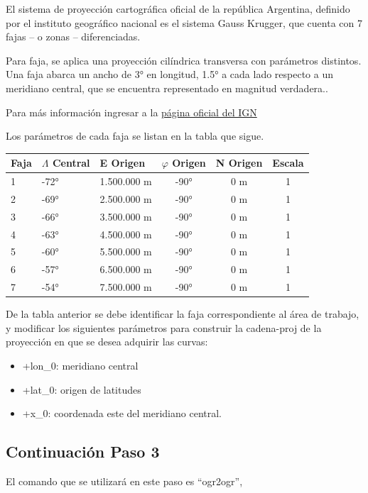 \documentclass[12pt,]{extarticle}
\begin{document}
El sistema de proyección cartográfica oficial de la república Argentina,
definido por el instituto geográfico nacional es el sistema Gauss
Krugger, que cuenta con 7 fajas -- o zonas -- diferenciadas.

Para faja, se aplica una proyección cilíndrica transversa con parámetros
distintos. Una faja abarca un ancho de 3° en longitud, 1.5° a cada lado
respecto a un meridiano central, que se encuentra representado en
magnitud verdadera..

Para más información ingresar a la
\href{http://www.ign.gob.ar/NuestrasActividades/ProduccionCartografica/sistemas-de-proyeccion}{página
oficial del IGN}

Los parámetros de cada faja se listan en la tabla que sigue.

\begin{minipage}{10cm}
\begin{longtable}[]{@{}lllccc@{}}
\toprule
Faja & \(\Lambda\) Central & E Origen & \(\varphi\) Origen & N Origen &
Escala\tabularnewline
\midrule
\endhead
1 & -72° & 1.500.000 m & -90° & 0 m & 1\tabularnewline
2 & -69° & 2.500.000 m & -90° & 0 m & 1\tabularnewline
3 & -66° & 3.500.000 m & -90° & 0 m & 1\tabularnewline
4 & -63° & 4.500.000 m & -90° & 0 m & 1\tabularnewline
5 & -60° & 5.500.000 m & -90° & 0 m & 1\tabularnewline
6 & -57° & 6.500.000 m & -90° & 0 m & 1\tabularnewline
7 & -54° & 7.500.000 m & -90° & 0 m & 1\tabularnewline
\bottomrule
\end{longtable}
\end{minipage}

De la tabla anterior se debe identificar la faja correspondiente al área
de trabajo, y modificar los siguientes parámetros para construir la
cadena-proj de la proyección en que se desea adquirir las curvas:

\begin{itemize}
\item
  +lon\_0: meridiano central
\item
  +lat\_0: origen de latitudes
\item
  +x\_0: coordenada este del meridiano central.
\end{itemize}

\hypertarget{continuaciuxf3n-paso-3}{%
\subsection{Continuación Paso 3}\label{continuaciuxf3n-paso-3}}

El comando que se utilizará en este paso es ``ogr2ogr'',
\end{document}
